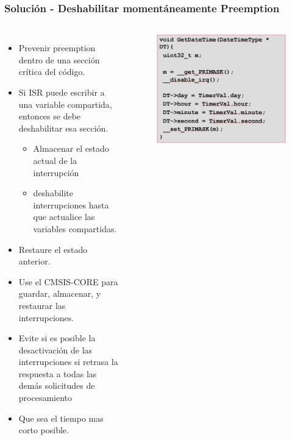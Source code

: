 \documentclass[10.5pt,scale=1.0,t,aspectratio=169,hyperref={pdfpagelabels=false}]{beamer}
\begin{document}
\begin{frame}
	\frametitle{Solución - Deshabilitar momentáneamente Preemption}
	\begin{columns}
		\begin{itemize}
			\item Prevenir preemption dentro de una sección crítica del código.
			\item Si ISR puede escribir a una variable compartida, entonces se debe deshabilitar esa sección.
			\begin{itemize}
				\item Almacenar el estado actual de la interrupción
				\item deshabilite interrupciones hasta que actualice las variables compartidas.
			\end{itemize}
			\item Restaure el estado anterior.
			\item Use el CMSIS-CORE para guardar, almacenar, y restaurar las interrupciones. 
			\item Evite si es posible la desactivación de las interrupciones si retrasa la respuesta a todas las demás solicitudes de procesamiento
			\item Que sea el tiempo mas corto posible. 
		\end{itemize}
		
		\begin{figure}
			\centering
			\includegraphics[scale=0.25]{09_DisablePreemption}
		\end{figure}
	\end{columns}
\end{frame}
\end{document}
